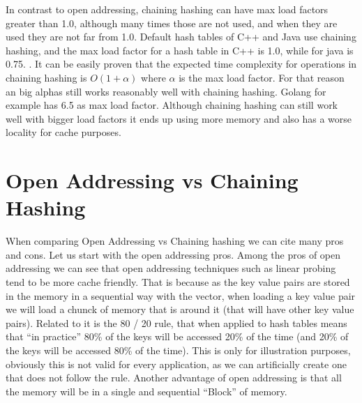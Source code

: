 In contrast to open addressing, chaining hashing can have max load factors greater than 1.0, although many times those are not used, and when they are used they are not far from 1.0. Default hash tables of C++ and Java use chaining hashing, and the max load factor for a hash table in C++ is 1.0, while for java is 0.75. \citep{MaxLoadFactorCplusplus}.
It can be easily proven that the expected time complexity for operations in chaining hashing is \( O(1 + \alpha) \) where \( \alpha \) is the max load factor. For that reason an big alphas still works reasonably well with chaining hashing. Golang for example has 6.5 as max load factor.
Although chaining hashing can still work well with bigger load factors it ends up using more memory and also has a worse locality for cache purposes.

\section{Open Addressing vs Chaining Hashing}

When comparing Open Addressing vs Chaining hashing we can cite many pros and cons. Let us start with the open addressing pros. Among the pros of open addressing we can see that open addressing techniques such as linear probing tend to be more cache friendly. That is because as the key value pairs are stored in the memory in a sequential way with the vector, when loading a key value pair we will load a chunck of memory that is around it (that will have other key value pairs). Related to it is the 80 / 20 rule, that when applied to hash tables means that ``in practice'' 80\% of the keys will be accessed 20\% of the time (and 20\% of the keys will be accessed 80\% of the time). This is only for illustration purposes, obviously this is not valid for every application, as we can artificially create one that does not follow the rule. Another advantage of open addressing is that all the memory will be in a single and sequential ``Block'' of memory. 